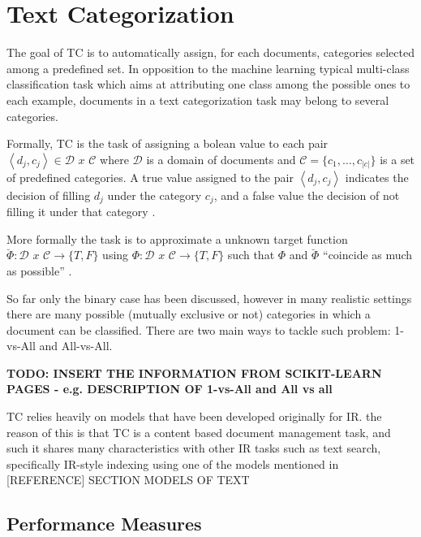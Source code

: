 
\section{Text Categorization}
\label{sec:rel_text_categorization}

The goal of \ac{TC} is to automatically assign, for each
documents, categories selected among a predefined set.
In opposition to the machine learning typical multi-class classification
task which aims at attributing one class among the possible ones to each
example, documents in a text categorization task may belong to several
categories. 

Formally,  \ac{TC} is the  task of  assigning a bolean value to each pair 
$\left\langle d_{j},c_{j}\right\rangle \in\mathcal{D}\,\, x\,\mathcal{\, C}$
where  $\mathcal{D}$  is a domain of documents and
$\mathcal{C}=\{c_{1},\ldots,c_{|c|}\}$ is a set of predefined categories. A
true value assigned to the pair $\left\langle d_{j},c_{j}\right\rangle $
indicates the decision of filling  $d_{j}$ under the category  $c_{j}$, and
a false value the decision of not filling it under that category \cite{Sebastiani02}. 

More formally the task is to approximate a unknown target function 
 $\breve{\Phi}:\mathcal{D}\,\, x\,\mathcal{\, C}\rightarrow\{T,F\}$  using 
 $\Phi:\mathcal{D}\,\, x\,\mathcal{\, C}\rightarrow\{T,F\}$  such that 
 $\Phi$ and  $\breve{\Phi}$ ``coincide as much as possible'' \cite{Sebastiani02}. 

So far only the binary case has been discussed, however in many realistic
settings there are many possible (mutually exclusive or not) categories in
which a document can be classified.  There are two main ways to  tackle
such problem: 1-vs-All and All-vs-All. 

\textbf{TODO: INSERT THE INFORMATION FROM SCIKIT-LEARN PAGES - e.g.
  DESCRIPTION OF 1-vs-All and All vs all}

\ac{TC} relies  heavily on  models that have been developed originally for \ac{IR}.
 the reason of this is that TC is a content based document management task,
 and such it shares many characteristics with other IR tasks such as text
 search, specifically \ac{IR}-style indexing using one of the models mentioned  in 
 [REFERENCE] SECTION MODELS OF TEXT



\subsection{Performance Measures}
\label{sec:sub_performance_measures}

